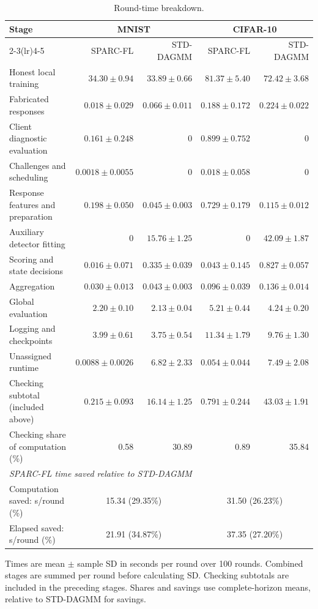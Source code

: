 \documentclass[journal]{IEEEtran}
\begin{document}
\begin{table}[t]\centering\footnotesize\setlength{\tabcolsep}{4pt}
\caption{Round-time breakdown.}\label{tab:std-segments}
\begin{tabular}{lrrrr}\toprule
\multirow{2}{*}{Stage} & \multicolumn{2}{c}{MNIST} & \multicolumn{2}{c}{CIFAR-10} \\
\cmidrule(lr){2-3}\cmidrule(lr){4-5}
 & SPARC-FL & STD-DAGMM & SPARC-FL & STD-DAGMM \\ \midrule
Honest local training & $34.30 \pm 0.94$ & $33.89 \pm 0.66$ & $81.37 \pm 5.40$ & $72.42 \pm 3.68$ \\
Fabricated responses & $0.018 \pm 0.029$ & $0.066 \pm 0.011$ & $0.188 \pm 0.172$ & $0.224 \pm 0.022$ \\
Client diagnostic evaluation & $0.161 \pm 0.248$ & $0$ & $0.899 \pm 0.752$ & $0$ \\
Challenges and scheduling & $0.0018 \pm 0.0055$ & $0$ & $0.018 \pm 0.058$ & $0$ \\
Response features and preparation & $0.198 \pm 0.050$ & $0.045 \pm 0.003$ & $0.729 \pm 0.179$ & $0.115 \pm 0.012$ \\
Auxiliary detector fitting & $0$ & $15.76 \pm 1.25$ & $0$ & $42.09 \pm 1.87$ \\
Scoring and state decisions & $0.016 \pm 0.071$ & $0.335 \pm 0.039$ & $0.043 \pm 0.145$ & $0.827 \pm 0.057$ \\
Aggregation & $0.030 \pm 0.013$ & $0.043 \pm 0.003$ & $0.096 \pm 0.039$ & $0.136 \pm 0.014$ \\
Global evaluation & $2.20 \pm 0.10$ & $2.13 \pm 0.04$ & $5.21 \pm 0.44$ & $4.24 \pm 0.20$ \\
\midrule
Logging and checkpoints & $3.99 \pm 0.61$ & $3.75 \pm 0.54$ & $11.34 \pm 1.79$ & $9.76 \pm 1.30$ \\
Unassigned runtime & $0.0088 \pm 0.0026$ & $6.82 \pm 2.33$ & $0.054 \pm 0.044$ & $7.49 \pm 2.08$ \\
\midrule
Checking subtotal (included above) & $0.215 \pm 0.093$ & $16.14 \pm 1.25$ & $0.791 \pm 0.244$ & $43.03 \pm 1.91$ \\
Checking share of computation (\%) & 0.58 & 30.89 & 0.89 & 35.84 \\
\midrule
\multicolumn{5}{l}{\textit{SPARC-FL time saved relative to STD-DAGMM}} \\
Computation saved: s/round (\%) & \multicolumn{2}{c}{15.34 (29.35\%)} & \multicolumn{2}{c}{31.50 (26.23\%)} \\
Elapsed saved: s/round (\%) & \multicolumn{2}{c}{21.91 (34.87\%)} & \multicolumn{2}{c}{37.35 (27.20\%)} \\
\bottomrule\end{tabular}
\par\smallskip\parbox{0.94\textwidth}{\scriptsize Times are mean $\pm$ sample SD in seconds per round over 100 rounds. Combined stages are summed per round before calculating SD. Checking subtotals are included in the preceding stages. Shares and savings use complete-horizon means, relative to STD-DAGMM for savings.}
\end{table}
\end{document}
